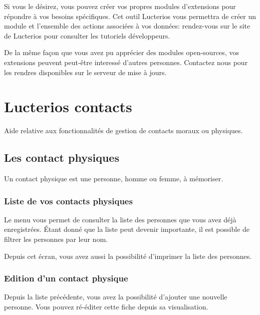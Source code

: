 \documentclass[letterpaper,10pt,french]{sphinxmanual}
\begin{document}
Si vous le désirez, vous pouvez créer vos propres modules d’extensions pour répondre à vos besoins spécifiques.
Cet outil Lucterios vous permettra de créer un module et l’ensemble des actions associées à vos données: rendez-vous sur le site de Lucterios pour consulter les tutoriels développeurs.

De la même façon que vous avez pu apprécier des modules open-sources, vos extensions peuvent peut-être interessé d’autres personnes.
Contactez nous pour les rendres disponibles sur le serveur de mise à jours.
\begin{quote}


\end{quote}


\chapter{Lucterios contacts}
\label{\detokenize{contacts/index:lucterios-contacts}}\label{\detokenize{contacts/index::doc}}
Aide relative aux fonctionnalités de gestion de contacts moraux ou physiques.


\section{Les contact physiques}
\label{\detokenize{contacts/individual:les-contact-physiques}}\label{\detokenize{contacts/individual::doc}}
Un contact physique est une personne, homme ou femme, à mémoriser.


\subsection{Liste de vos contacts physiques}
\label{\detokenize{contacts/individual:liste-de-vos-contacts-physiques}}
Le menu  vous permet de consulter la liste des personnes que vous avez déjà enregistrées. Étant donné que la liste peut devenir importante, il est possible de filtrer les personnes par leur nom.

Depuis cet écran, vous avez aussi la possibilité d’imprimer la liste des personnes.

\noindent{}


\subsection{Edition d’un contact physique}
\label{\detokenize{contacts/individual:edition-d-un-contact-physique}}
Depuis la liste précédente, vous avez la possibilité d’ajouter une nouvelle personne. Vous pouvez ré-éditer cette fiche depuis sa visualisation.
\end{document}
